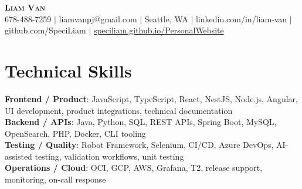 \documentclass[letterpaper,11pt]{article}
\begin{document}

%
\begin{center}
    \textbf{\Huge \scshape Liam Van} \\ \vspace{1pt}
    \small 678-488-7259 $|$ \small {liamvanpj@gmail.com} $|$ Seattle, WA
 {{$|$ linkedin.com/in/liam-van} {$|$ github.com/SpeciLiam} {$|$ \href{https://speciliam.github.io/PersonalWebsite}{speciliam.github.io/PersonalWebsite}}}

\end{center}

\section{Technical Skills}
 \begin{itemize}[leftmargin=0.15in, label={}]
    \small{\item{
     \textbf{Frontend / Product}{: JavaScript, TypeScript, React, NestJS, Node.js, Angular, UI development, product integrations, technical documentation} \\
     \textbf{Backend / APIs}{: Java, Python, SQL, REST APIs, Spring Boot, MySQL, OpenSearch, PHP, Docker, CLI tooling} \\
     \textbf{Testing / Quality}{: Robot Framework, Selenium, CI/CD, Azure DevOps, AI-assisted testing, validation workflows, unit testing} \\
     \textbf{Operations / Cloud}{: OCI, GCP, AWS, Grafana, T2, release support, monitoring, on-call response} \\
    }}
 \end{itemize}
%
\end{document}
